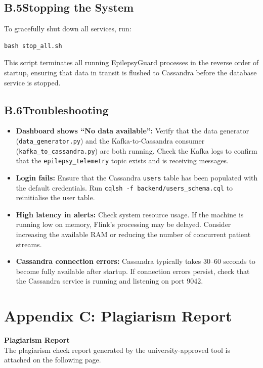 \documentclass[12pt, a4paper, oneside]{report}
\begin{document}
\section*{B.5\quad Stopping the System}
To gracefully shut down all services, run:
\begin{verbatim}
bash stop_all.sh
\end{verbatim}
This script terminates all running EpilepsyGuard processes in the reverse order of startup, ensuring that data in transit is flushed to Cassandra before the database service is stopped.

\section*{B.6\quad Troubleshooting}
\begin{itemize}
    \item \textbf{Dashboard shows ``No data available'':} Verify that the data generator (\texttt{data\_generator.py}) and the Kafka-to-Cassandra consumer (\texttt{kafka\_to\_cassandra.py}) are both running. Check the Kafka logs to confirm that the \texttt{epilepsy\_telemetry} topic exists and is receiving messages.
    \item \textbf{Login fails:} Ensure that the Cassandra \texttt{users} table has been populated with the default credentials. Run \texttt{cqlsh -f backend/users\_schema.cql} to reinitialise the user table.
    \item \textbf{High latency in alerts:} Check system resource usage. If the machine is running low on memory, Flink's processing may be delayed. Consider increasing the available RAM or reducing the number of concurrent patient streams.
    \item \textbf{Cassandra connection errors:} Cassandra typically takes 30--60 seconds to become fully available after startup. If connection errors persist, check that the Cassandra service is running and listening on port 9042.
\end{itemize}

\chapter*{Appendix C: Plagiarism Report}

\begin{center}
    \vspace{3cm}
    {\Large \textbf{Plagiarism Report}} \\
    \vspace{1cm}
    {\normalsize The plagiarism check report generated by the university-approved tool is attached on the following page.}
    \vspace{3cm}

\end{center}
\end{document}
